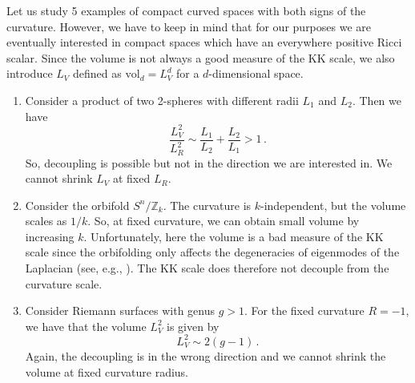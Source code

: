 \documentclass[11pt]{article}
\newcommand{\be}{\begin{equation}}
\newcommand{\ee}{\end{equation}}
\def\be{\begin{equation}}
\def\ee{\end{equation}}
\renewcommand{\[}{\left[}
\renewcommand{\]}{\right]}
\renewcommand{\(}{\left(}
\renewcommand{\)}{\right)}
\newcommand{\vol}{\text{vol}}
\newcommand{\<}{\langle}
\renewcommand{\>}{\rangle}
\begin{document}
Let us study 5 examples of compact curved spaces with both signs of the curvature. However, we have to keep in mind that for our purposes we are eventually interested in compact spaces which have an everywhere positive Ricci scalar. Since the volume is not always a good measure of the KK scale, we also introduce $L_V$ defined as $\vol_d =  L_V^d$ for a $d$-dimensional space. 
\begin{enumerate}
\item  Consider a product of two 2-spheres with different radii $L_1$ and $L_2$. Then we have
\be
\frac{L^2_{V}}{L_R^2} \sim \frac{L_1}{L_2} + \frac{L_2}{L_1} >1\,.
\ee
So, decoupling is possible but not in the direction we are interested in. We cannot shrink $L_V$ at fixed $L_R$.

\item Consider the orbifold $S^n/\mathbb{Z}_k$. The curvature is $k$-independent, but the volume scales as $1/k$. So, at fixed curvature, we can obtain small volume by increasing $k$. Unfortunately, here the volume is a bad measure of the KK scale since the orbifolding only affects the degeneracies of eigenmodes of the Laplacian (see, e.g., \cite{Polchinski:2009ch}). The KK scale does therefore not decouple from the curvature scale.

\item  Consider Riemann surfaces with genus $g>1$. For the fixed curvature $R=-1$, we have that the volume $L_{V}^2$ is given by
\be
L^2_{V} \sim 2(g-1)\,.
\ee
Again, the decoupling is in the wrong direction and we cannot shrink the volume at fixed curvature radius.


\end{enumerate}
\end{document}
